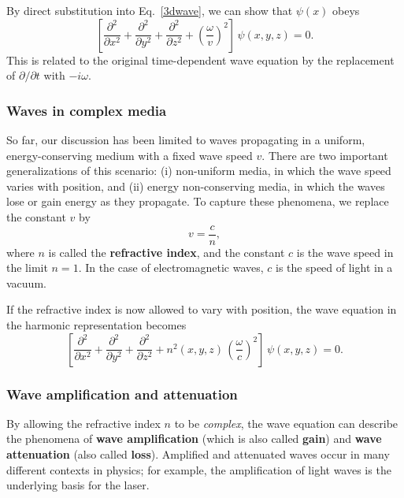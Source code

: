 \documentclass[10pt,a4paper]{article}
\begin{document}
By direct substitution into Eq.~\eqref{3dwave}, we can show that
$\psi(x)$ obeys
\begin{equation}
\left[\frac{\partial^2}{\partial x^2} + \frac{\partial^2}{\partial y^2} + \frac{\partial^2}{\partial z^2} + \left(\frac{\omega}{v}\right)^2\right] \, \psi(x,y,z) = 0.
\end{equation}
This is related to the original time-dependent wave equation by the
replacement of $\partial/\partial t$ with $-i\omega$.

\subsubsection{Waves in complex media}
\label{waves-in-complex-media}

So far, our discussion has been limited to waves propagating in a
uniform, energy-conserving medium with a fixed wave speed $v$.  There
are two important generalizations of this scenario: (i) non-uniform
media, in which the wave speed varies with position, and (ii) energy
non-conserving media, in which the waves lose or gain energy as they
propagate. To capture these phenomena, we replace the constant $v$ by
\begin{equation}
v = \frac{c}{n},
\end{equation}
where $n$ is called the \textbf{refractive index}, and the constant
$c$ is the wave speed in the limit $n = 1$. In the case of
electromagnetic waves, $c$ is the speed of light in a vacuum.

If the refractive index is now allowed to vary with position, the wave
equation in the harmonic representation becomes
\begin{equation}
\left[\frac{\partial^2}{\partial x^2} + \frac{\partial^2}{\partial y^2} + \frac{\partial^2}{\partial z^2} + n^2(x,y,z)\, \left(\frac{\omega}{c}\right)^2\right] \, \psi(x,y,z) = 0.
\end{equation}

\subsubsection{Wave amplification and attenuation}
\label{gainloss}

By allowing the refractive index $n$ to be \emph{complex}, the wave
equation can describe the phenomena of \textbf{wave amplification}
(which is also called \textbf{gain}) and \textbf{wave attenuation} (also
called \textbf{loss}). Amplified and attenuated waves occur in many
different contexts in physics; for example, the amplification of light
waves is the underlying basis for the laser.
\end{document}
